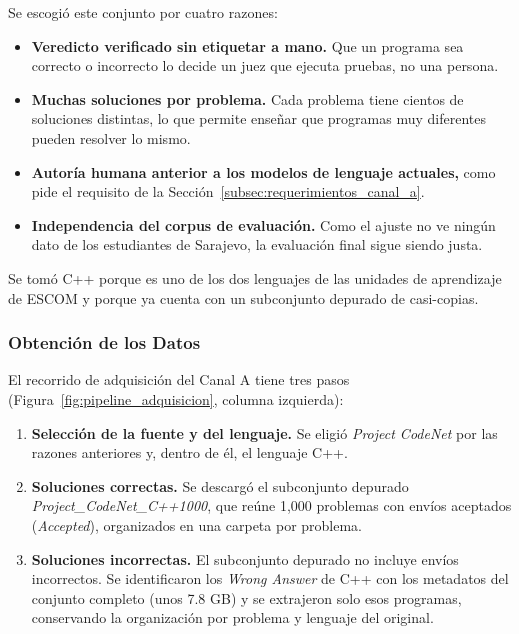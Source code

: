 Se escogió este conjunto por cuatro razones:

\begin{itemize}
    \item \textbf{Veredicto verificado sin etiquetar a mano.} Que un programa sea correcto o incorrecto lo decide un juez que ejecuta pruebas, no una persona.
    \item \textbf{Muchas soluciones por problema.} Cada problema tiene cientos de soluciones distintas, lo que permite enseñar que programas muy diferentes pueden resolver lo mismo.
    \item \textbf{Autoría humana anterior a los modelos de lenguaje actuales,} como pide el requisito de la Sección~\ref{subsec:requerimientos_canal_a}.
    \item \textbf{Independencia del corpus de evaluación.} Como el ajuste no ve ningún dato de los estudiantes de Sarajevo, la evaluación final sigue siendo justa.
\end{itemize}

Se tomó C++ porque es uno de los dos lenguajes de las unidades de aprendizaje de ESCOM y porque ya cuenta con un subconjunto depurado de casi-copias.

\subsubsection{Obtención de los Datos}
\label{subsec:obtencion_codenet}

El recorrido de adquisición del Canal A tiene tres pasos (Figura~\ref{fig:pipeline_adquisicion}, columna izquierda):

\begin{enumerate}
    \item \textbf{Selección de la fuente y del lenguaje.} Se eligió \textit{Project CodeNet} por las razones anteriores y, dentro de él, el lenguaje C++.
    \item \textbf{Soluciones correctas.} Se descargó el subconjunto depurado \textit{Project\_CodeNet\_C++1000}, que reúne 1,000 problemas con envíos aceptados (\textit{Accepted}), organizados en una carpeta por problema.
    \item \textbf{Soluciones incorrectas.} El subconjunto depurado no incluye envíos incorrectos. Se identificaron los \textit{Wrong Answer} de C++ con los metadatos del conjunto completo (unos 7.8 GB) y se extrajeron solo esos programas, conservando la organización por problema y lenguaje del original.
\end{enumerate}

